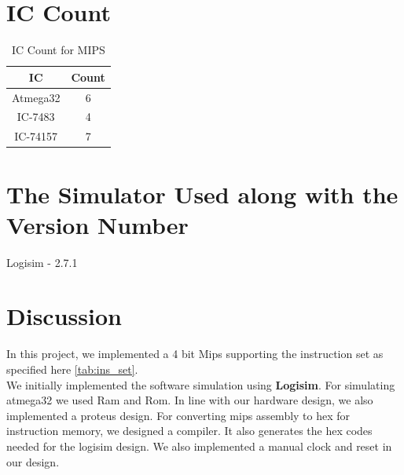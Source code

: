 \documentclass[12]{article}
\begin{document}
\section{IC Count}

\begin{table}[!h]
    \centering
    \begin{tabular}{| c | c |}
        \hline
        \textbf{IC} & \textbf{Count}\\  \hline \hline
        Atmega32 & 6 \\ \hline
        IC-7483 & 4 \\ \hline
        IC-74157 & 7 \\ \hline
    \end{tabular}
    \caption{IC Count for MIPS}
    \label{tab:count_table}
\end{table}

\section{The Simulator Used along with the Version Number}
\large
Logisim - 2.7.1


\section{Discussion}
\large
In this project, we implemented a 4 bit Mips supporting the instruction set as specified here \ref{tab:ins_set}. \\

We initially implemented the software simulation using \textbf{Logisim}. For simulating atmega32 we used Ram and Rom. In line with our hardware design, we also implemented a proteus design. For converting mips assembly to hex for instruction memory, we designed a compiler. It also generates the hex codes needed for the logisim design. We also implemented a manual clock and reset in our design.
\end{document}
